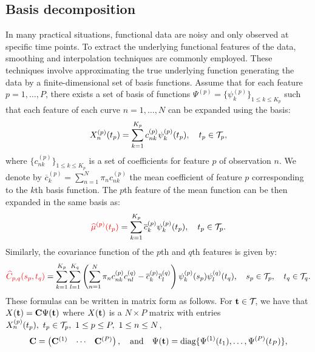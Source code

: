 \subsection{Basis decomposition} %
\label{sub:basis_decomposition}


In many practical situations, functional data are noisy and only observed at specific time points. To extract the underlying functional features of the data, smoothing and interpolation techniques are commonly employed. These techniques involve approximating the true underlying function generating the data by a finite-dimensional set of basis functions. Assume that for each feature $p = 1, \dots, P$, there exists a set of basis of functions $\Psi^{(p)} = \{\psi_k^{(p)}\}_{1 \leq k \leq K_p}$ such that each feature of each curve $n = 1, \dots, N$ can be expanded using the basis:
\begin{equation}\label{eq:curve_basis_expansion}
X_n^{(p)}(t_p) = \sum_{k = 1}^{K_p} c^{(p)}_{nk}\psi_k^{(p)}(t_p), \quad t_p \in \mathcal{T}_{p},
\end{equation}
where $\{c^{(p)}_{nk}\}_{1 \leq k \leq K_p}$ is a set of coefficients for feature $p$ of observation $n$. We denote by $\overline{c}_k^{(p)} = \sum_{n = 1}^N \pi_n c^{(p)}_{nk}$ the mean coefficient of feature $p$ corresponding to the $k$th basis function.
The $p$th feature of the mean function can be then expanded in the same basis as:
\begin{equation}
    \textcolor{red}{\widehat{\mu}^{(p)}(t_p)} = \sum_{k = 1}^{K_p} \overline{c}_k^{(p)}\psi_k^{(p)}(t_p), \quad t_p \in \mathcal{T}_{p}.
\end{equation}
Similarly, the covariance function of the $p$th and $q$th features is given by:
\begin{equation}
    \textcolor{red}{\widehat{C}_{p,q}(s_p, t_q)} = \sum_{k = 1}^{K_p} \sum_{l = 1}^{K_q} \left(\sum_{n = 1}^N \pi_n c^{(p)}_{nk}c^{(q)}_{nl} - \overline{c}_k^{(p)}\overline{c}_l^{(q)}\right)\psi_k^{(p)}(s_p)\psi_l^{(q)}(t_q), \quad s_p \in \mathcal{T}_{p},\quad t_q \in \mathcal{T}_{q}.
\end{equation}
These formulas can be written in matrix form as follows. For $\mathbf{t} \in \mathcal{T}_{}$, we have that $X(\mathbf{t}) = \mathbf{C}\Psi(\mathbf{t})$ where $X(\mathbf{t})$ is a $N \times P$ matrix with entries $X_n^{(p)}(t_p),~t_p \in \mathcal{T}_{p},~1 \leq p \leq P,~1 \leq n \leq N$,
\begin{equation}
    \mathbf{C} = \begin{pmatrix}
            \mathbf{C}^{(1)} & \cdots & \mathbf{C}^{(P)} \\
        \end{pmatrix}, \quad \text{and}\quad
    \Psi(\mathbf{t}) = \text{diag}\{\Psi^{(1)}(t_1), \dots, \Psi^{(P)}(t_P)\},
\end{equation}
